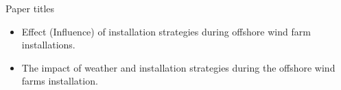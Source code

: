 Paper titles
\begin{itemize}
\item Effect (Influence) of installation strategies during offshore wind farm installations.
\item The impact of weather and installation strategies during the offshore wind farms installation.
\end{itemize}